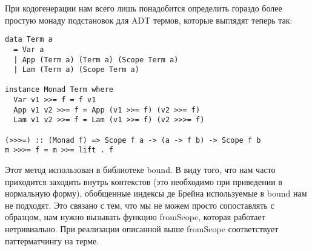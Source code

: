 При кодогенерации нам всего лишь понадобится определить гораздо более простую монаду подстановок для ADT термов, которые выглядят теперь так:


\begin{lstlisting}[frame=single]
data Term a
  = Var a
  | App (Term a) (Term a) (Scope Term a)
  | Lam (Term a) (Scope Term a)

instance Monad Term where
  Var v1 >>= f = f v1
  App v1 v2 >>= f = App (v1 >>= f) (v2 >>= f)
  Lam v1 v2 >>= f = Lam (v1 >>= f) (v2 >>>= f)

(>>>=) :: (Monad f) => Scope f a -> (a -> f b) -> Scope f b
m >>>= f = m >>= lift . f
\end{lstlisting}


Этот метод использован в библиотеке bound\cite{bound}. В виду того, что нам часто приходится заходить внутрь контекстов (это необходимо при приведении в нормальную форму), обобщенные индексы де Брейна используемые в bound нам не подходят. Это связано с тем, что мы не можем просто сопоставлять с образцом, нам нужно вызывать функцию fromScope, которая работает нетривиально. При реализации описанной выше fromScope соответствует паттерматчингу на терме.
